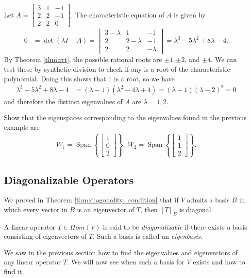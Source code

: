 \documentclass[12pt,letterpaper,reqno]{article}
\numberwithin{equation}{section}
\DeclareMathOperator{\Span}{Span}
\begin{document}
\begin{example}
Let $A=\begin{bmatrix}
	3 & 1 & -1 \\
	2 & 2 & -1 \\
	2 & 2 & 0
\end{bmatrix}$. The characteristic equation of $A$ is given by
\begin{align*}
	0&=\det(\lambda I-A)=\begin{vmatrix}
		3-\lambda & 1 & -1 \\
	2 & 2-\lambda & -1 \\
	2 & 2 & -\lambda
	\end{vmatrix}=\lambda^3-5\lambda^2+8\lambda-4.
\end{align*}	
By Theorem \ref{thm:rrt}, the possible rational roots are $\pm 1, \pm 2$, and $\pm 4$. We can test these by synthetic division to check if any is a root of the characteristic polynomial. Doing this shows that $1$ is a root, so we have 
\begin{align*}
	\lambda^3-5\lambda^2+8\lambda-4&=(\lambda-1)(\lambda^2-4\lambda+4)=(\lambda-1)(\lambda-2)^2=0
\end{align*}
and therefore the distinct eigenvalues of $A$ are $\lambda =1,2$.
\end{example}

\begin{exercise}
Show that the eigenspaces corresponding to the eigenvalues found in the previous example are 
\begin{align*}
	W_1=\Span \left\{\begin{bmatrix}
		1 \\ 0 \\ 2
	\end{bmatrix}\right\}, \ W_2=\Span \left\{\begin{bmatrix}
		1 \\ 1 \\ 2
	\end{bmatrix}\right\}.
\end{align*}	
\end{exercise}

\subsection{Diagonalizable Operators}
We proved in Theorem \ref{thm:diagonality_condition} that  if $V$ admits a basis $B$ in which every vector in $B$ is an eigenvector of $T$, then $[T]_B$ is diagonal.

\begin{defn}
A linear operator $T \in Hom(V)$ is said to be \emph{diagonalizable} if there exists a basis consisting of eigenvectors of $T$. Such a basis is called an \emph{eigenbasis}.	
\end{defn}
We saw in the previous section how to find the eigenvalues and eigenvectors of any linear operator $T$. We will now see when such a basis for $V$ exists and how to find it.
\end{document}
